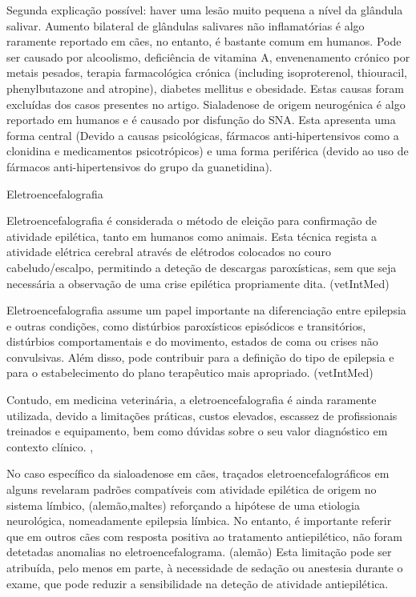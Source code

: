 Segunda explicação possível: haver uma lesão muito pequena a nível da glândula salivar. Aumento bilateral de glândulas salivares não inflamatórias é algo raramente reportado em cães, no entanto, é bastante comum em humanos. Pode ser causado por alcoolismo, deficiência de vitamina A, envenenamento crónico por metais pesados, terapia farmacológica crónica (including isoproterenol, thiouracil, phenylbutazone and atropine), diabetes mellitus e obesidade. Estas causas foram excluídas dos casos presentes no artigo. Sialadenose de origem neurogénica é algo reportado em humanos e é causado por disfunção do SNA. Esta apresenta uma forma central (Devido a causas psicológicas, fármacos anti-hipertensivos como a clonidina e medicamentos psicotrópicos) e uma forma periférica (devido ao uso de fármacos anti-hipertensivos do grupo da guanetidina).

Eletroencefalografia


Eletroencefalografia é considerada o método de eleição para confirmação de atividade epilética, tanto em humanos como animais. \cite{Everest2024} Esta técnica regista a atividade elétrica cerebral através de elétrodos colocados no couro cabeludo/escalpo, \cite{Everest2024} permitindo a deteção de descargas paroxísticas, sem que seja necessária a observação de uma crise epilética propriamente dita. (vetIntMed)


Eletroencefalografia assume um papel importante na diferenciação entre epilepsia e outras condições, como distúrbios paroxísticos episódicos e transitórios, distúrbios comportamentais e do movimento, estados de coma ou crises não convulsivas. \cite{Luca2023} Além disso, pode contribuir para a definição do tipo de epilepsia e para o estabelecimento do plano terapêutico mais apropriado. (vetIntMed)


Contudo, em medicina veterinária, a eletroencefalografia é ainda raramente utilizada, devido a limitações práticas, custos elevados, escassez de profissionais treinados e equipamento, bem como dúvidas sobre o seu valor diagnóstico em contexto clínico. \cite{Everest2024},\cite{Luca2023}


No caso específico da sialoadenose em cães, traçados eletroencefalográficos em alguns revelaram padrões compatíveis com atividade epilética de origem no sistema límbico, (alemão,maltes) reforçando a hipótese de uma etiologia neurológica, nomeadamente epilepsia límbica. No entanto, é importante referir que em outros cães com resposta positiva ao tratamento antiepilético, não foram detetadas anomalias no eletroencefalograma. (alemão) Esta limitação pode ser atribuída, pelo menos em parte, à necessidade de sedação ou anestesia durante o exame, que pode reduzir a sensibilidade na deteção de atividade antiepilética. \cite{Loscher2022}

